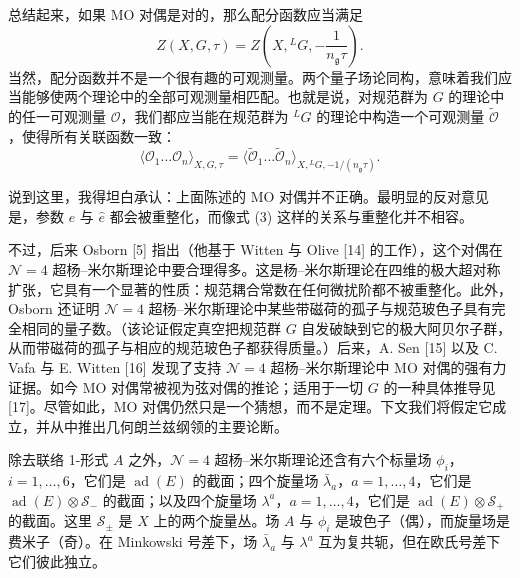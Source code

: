 \documentclass[11pt,a4paper,UTF8]{ctexart}
\begin{document}
总结起来，如果 MO 对偶是对的，那么配分函数应当满足
\[
    Z(X,G,\tau)=Z\left(X,{}^{L}G,-\frac{1}{n_{\mathfrak{g}}\tau}\right).
\]
当然，配分函数并不是一个很有趣的可观测量。两个量子场论同构，意味着我们应当能够使两个理论中的全部可观测量相匹配。也就是说，对规范群为 $G$ 的理论中的任一可观测量 $\mathcal{O}$，我们都应当能在规范群为 ${}^{L}G$ 的理论中构造一个可观测量 $\tilde{\mathcal{O}}$，使得所有关联函数一致：
\[
    \langle\mathcal{O}_{1}\ldots\mathcal{O}_{n}\rangle_{X,G,\tau}
    =\langle\tilde{\mathcal{O}}_{1}\ldots\tilde{\mathcal{O}}_{n}\rangle_{X,{}^{L}G,-1/(n_{\mathfrak{g}}\tau)}.
\]

说到这里，我得坦白承认：上面陈述的 MO 对偶并不正确。最明显的反对意见是，参数 $e$ 与 $\hat{e}$ 都会被重整化，而像式 (3) 这样的关系与重整化并不相容。

不过，后来 Osborn [5] 指出（他基于 Witten 与 Olive [14] 的工作），这个对偶在 $\mathcal{N}=4$ 超杨–米尔斯理论中要合理得多。这是杨–米尔斯理论在四维的极大超对称扩张，它具有一个显著的性质：规范耦合常数在任何微扰阶都不被重整化。此外，Osborn 还证明 $\mathcal{N}=4$ 超杨–米尔斯理论中某些带磁荷的孤子与规范玻色子具有完全相同的量子数。（该论证假定真空把规范群 $G$ 自发破缺到它的极大阿贝尔子群，从而带磁荷的孤子与相应的规范玻色子都获得质量。）后来，A. Sen [15] 以及 C. Vafa 与 E. Witten [16] 发现了支持 $\mathcal{N}=4$ 超杨–米尔斯理论中 MO 对偶的强有力证据。如今 MO 对偶常被视为弦对偶的推论；适用于一切 $G$ 的一种具体推导见 [17]。尽管如此，MO 对偶仍然只是一个猜想，而不是定理。下文我们将假定它成立，并从中推出几何朗兰兹纲领的主要论断。

除去联络 1-形式 $A$ 之外，$\mathcal{N}=4$ 超杨–米尔斯理论还含有六个标量场 $\phi_{i}$，$i=1,\ldots,6$，它们是 $\operatorname{ad}(E)$ 的截面；四个旋量场 $\bar{\lambda}_{a}$，$a=1,\ldots,4$，它们是 $\operatorname{ad}(E)\otimes\mathcal{S}_{-}$ 的截面；以及四个旋量场 $\lambda^{a}$，$a=1,\ldots,4$，它们是 $\operatorname{ad}(E)\otimes\mathcal{S}_{+}$ 的截面。这里 $\mathcal{S}_{\pm}$ 是 $X$ 上的两个旋量丛。场 $A$ 与 $\phi_{i}$ 是玻色子（偶），而旋量场是费米子（奇）。在 Minkowski 号差下，场 $\bar{\lambda}_{a}$ 与 $\lambda^{a}$ 互为复共轭，但在欧氏号差下它们彼此独立。
\end{document}
